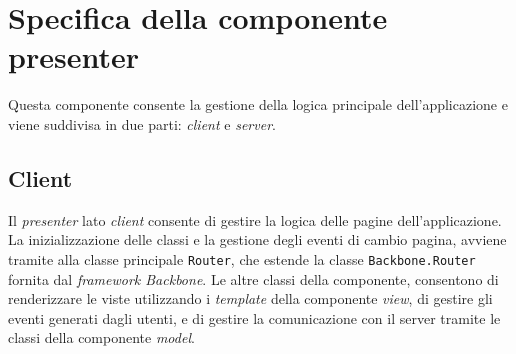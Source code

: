 \section{Specifica della componente presenter}
Questa componente consente la gestione della logica principale dell'applicazione \progetto{} e viene suddivisa in due parti: \textit{client} e \textit{server}.

\subsection{Client}

Il \textit{presenter} lato \textit{client} consente di gestire la logica delle pagine dell'applicazione.
La inizializzazione delle classi e la gestione degli eventi di cambio pagina, avviene tramite alla classe principale \texttt{Router}, che estende la classe \texttt{Backbone.Router} fornita dal \textit{framework Backbone}.
Le altre classi della componente, consentono di renderizzare le viste utilizzando i \textit{template} della componente \textit{view}, di gestire gli eventi generati dagli utenti, e di gestire la comunicazione con il server tramite le classi della componente \textit{model}.

